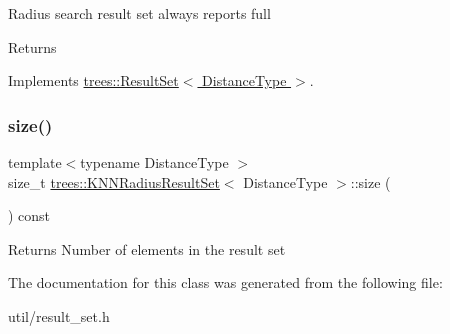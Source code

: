 Radius search result set always reports full \begin{DoxyReturn}{Returns}

\end{DoxyReturn}


Implements \hyperlink{classtrees_1_1_result_set}{trees\+::\+Result\+Set$<$ Distance\+Type $>$}.

\mbox{\label{classtrees_1_1_k_n_n_radius_result_set_a3e6a6b74d2dbf9792f4ed632ce4be376}} 
\subsubsection{\texorpdfstring{size()}{size()}}
{\footnotesize\ttfamily template$<$typename Distance\+Type $>$ \\
size\+\_\+t \hyperlink{classtrees_1_1_k_n_n_radius_result_set}{trees\+::\+K\+N\+N\+Radius\+Result\+Set}$<$ Distance\+Type $>$\+::size (\begin{DoxyParamCaption}{ }\end{DoxyParamCaption}) const\hspace{0.3cm}{\ttfamily [inline]}}

\begin{DoxyReturn}{Returns}
Number of elements in the result set 
\end{DoxyReturn}


The documentation for this class was generated from the following file\+:\begin{DoxyCompactItemize}
\item 
util/result\+\_\+set.\+h\end{DoxyCompactItemize}
